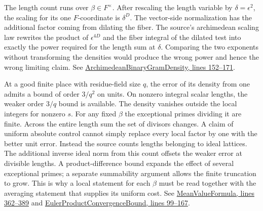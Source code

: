 \documentclass[12pt,letterpaper]{article}
\begin{document}
The length count runs over $\beta\in F^\times$. After rescaling the length variable by $\delta=\epsilon^2$, the scaling for its one $F$-coordinate is $\delta^D$. The vector-side normalization has the additional factor coming from dilating the fiber. The source's archimedean scaling law rewrites the product of $\epsilon^{4D}$ and the fiber integral of the dilated test into exactly the power required for the length sum at $\delta$. Comparing the two exponents without transforming the densities would produce the wrong power and hence the wrong limiting claim. See \href{https://github.com/nousentllc/riemann-hypothesis/blob/40e56bab026552e089d7afcfeff08d2defb9c005/src/Development/AutomorphicSpectrum/Proofs/BlockDecomposition/ArchimedeanBinaryGramDensity.lean#L152-L171}{ArchimedeanBinaryGramDensity, lines 152--171}.

At a good finite place with residue-field size $q$, the error of its density from one admits a bound of order $3/q^2$ on units. On nonzero integral scalar lengths, the weaker order $3/q$ bound is available. The density vanishes outside the local integers for nonzero $s$. For any fixed $\beta$ the exceptional primes dividing it are finite. Across the entire length sum the set of divisors changes. A claim of uniform absolute control cannot simply replace every local factor by one with the better unit error. Instead the source counts lengths belonging to ideal lattices. The additional inverse ideal norm from this count offsets the weaker error at divisible lengths. A product-difference bound expands the effect of several exceptional primes; a separate summability argument allows the finite truncation to grow. This is why a local statement for each $\beta$ must be read together with the averaging statement that supplies its uniform cost. See \href{https://github.com/nousentllc/riemann-hypothesis/blob/40e56bab026552e089d7afcfeff08d2defb9c005/src/Development/AutomorphicSpectrum/Proofs/BlockDecomposition/MeanValueFormula.lean#L362-L389}{MeanValueFormula, lines 362--389} and \href{https://github.com/nousentllc/riemann-hypothesis/blob/40e56bab026552e089d7afcfeff08d2defb9c005/src/Development/AutomorphicSpectrum/Proofs/BlockDecomposition/EulerProductConvergenceBound.lean#L99-L167}{EulerProductConvergenceBound, lines 99--167}.
\end{document}
